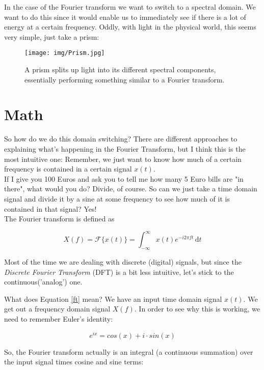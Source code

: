 In the case of the Fourier transform we want to switch to a spectral domain. We want to do this since it would enable us to immediately see if there is a lot of energy at a certain frequency. Oddly, with light in the physical world, this seems very simple, just take a prism:

\begin{figure}[H]
	\centering
	\texttt{[image: img/Prism.jpg]}
	\caption[prism]
	{A prism splits up light into its different spectral components, essentially performing something similar to a Fourier transform.}
	\label{fig:prism}
\end{figure}

\section{Math}
So how do we do this domain switching? There are different approaches to explaining what's happening in the Fourier Transform, but I think this is the most intuitive one: Remember, we just want to know how much of a certain frequency is contained in a certain signal $x(t)$.\\
If I give you 100 Euros and ask you to tell me how many 5 Euro bills are "in there", what would you do? Divide, of course. So can we just take a time domain signal and divide it by a sine at some frequency to see how much of it is contained in that signal? Yes!\\
The Fourier transform is defined as

\begin{equation}
	X(f)= \mathcal{F} \{x(t)\} = \int_{-\infty}^\infty \! x(t) e^{-i2\pi ft} \, \mathrm{d}t
	\label{ft}
\end{equation}

Most of the time we are dealing with discrete (digital) signals, but since the  \textit{Discrete Fourier Transform} (DFT) is a bit less intuitive, let's stick to the continuous('analog') one.


What does Equation \ref{ft} mean? We have an input time domain signal $x(t)$. We get out a frequency domain signal $X(f)$. In order to see why this is working, we need to remember Euler's identity:

\begin{equation}
	e ^{ix} = cos(x)+i \cdot sin(x)
\end{equation}

So, the Fourier transform actually is an integral (a continuous summation) over the input signal times cosine and sine terms:


